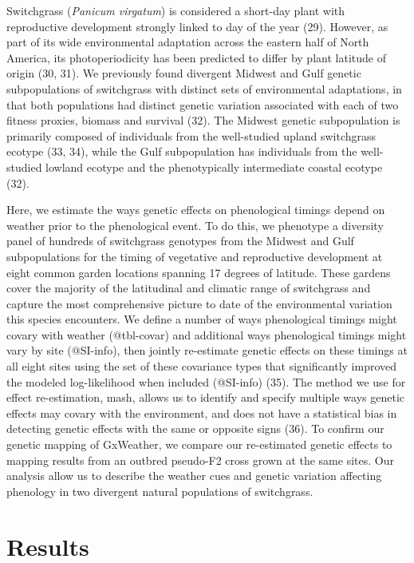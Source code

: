 \documentclass[
  9pt,
  twocolumn,
  twoside]{pnas-new}
\begin{document}
Switchgrass (\emph{Panicum virgatum}) is considered a short-day plant
with reproductive development strongly linked to day of the year (29).
However, as part of its wide environmental adaptation across the eastern
half of North America, its photoperiodicity has been predicted to differ
by plant latitude of origin (30, 31). We previously found divergent
Midwest and Gulf genetic subpopulations of switchgrass with distinct
sets of environmental adaptations, in that both populations had distinct
genetic variation associated with each of two fitness proxies, biomass
and survival (32). The Midwest genetic subpopulation is primarily
composed of individuals from the well-studied upland switchgrass ecotype
(33, 34), while the Gulf subpopulation has individuals from the
well-studied lowland ecotype and the phenotypically intermediate coastal
ecotype (32).

Here, we estimate the ways genetic effects on phenological timings
depend on weather prior to the phenological event. To do this, we
phenotype a diversity panel of hundreds of switchgrass genotypes from
the Midwest and Gulf subpopulations for the timing of vegetative and
reproductive development at eight common garden locations spanning 17
degrees of latitude. These gardens cover the majority of the latitudinal
and climatic range of switchgrass and capture the most comprehensive
picture to date of the environmental variation this species encounters.
We define a number of ways phenological timings might covary with
weather (@tbl-covar) and additional ways phenological timings might vary
by site (@SI-info), then jointly re-estimate genetic effects on these
timings at all eight sites using the set of these covariance types that
significantly improved the modeled log-likelihood when included
(@SI-info) (35). The method we use for effect re-estimation, mash,
allows us to identify and specify multiple ways genetic effects may
covary with the environment, and does not have a statistical bias in
detecting genetic effects with the same or opposite signs (36). To
confirm our genetic mapping of GxWeather, we compare our re-estimated
genetic effects to mapping results from an outbred pseudo-F2 cross grown
at the same sites. Our analysis allow us to describe the weather cues
and genetic variation affecting phenology in two divergent natural
populations of switchgrass.

\section{Results}\label{results}
\end{document}
